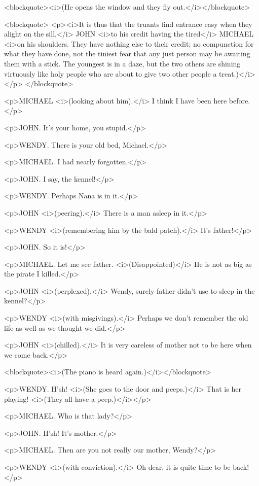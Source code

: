 <blockquote><i>(He opens the window and they fly out.</i></blockquote>

<blockquote> <p><i>It is thus that the truants find entrance easy when they alight on the sill,</i> JOHN <i>to his credit having the tired</i> MICHAEL <i>on his shoulders. They have nothing else to their credit; no compunction for what they have done, not the tiniest fear that any just person may be awaiting them with a stick. The youngest is in a daze, but the two others are shining virtuously like holy people who are about to give two other people a treat.)</i></p> </blockquote>

<p>MICHAEL <i>(looking about him).</i> I think I have been here before.</p>

<p>JOHN. It's your home, you stupid.</p>

<p>WENDY. There is your old bed, Michael.</p>

<p>MICHAEL. I had nearly forgotten.</p>

<p>JOHN. I say, the kennel!</p>

<p>WENDY. Perhaps Nana is in it.</p>

<p>JOHN <i>(peering).</i> There is a man asleep in it.</p>

<p>WENDY <i>(remembering him by the bald patch).</i> It's father!</p>

<p>JOHN. So it is!</p>

<p>MICHAEL. Let me see father. <i>(Disappointed)</i> He is not as big as the pirate I killed.</p>

<p>JOHN <i>(perplexed).</i> Wendy, surely father didn't use to sleep in the kennel?</p>

<p>WENDY <i>(with misgivings).</i> Perhaps we don't remember the old life as well as we thought we did.</p>

<p>JOHN <i>(chilled).</i> It is very careless of mother not to be here when we come back.</p>

<blockquote><i>(The piano is heard again.)</i></blockquote>

<p>WENDY. H'sh! <i>(She goes to the door and peeps.)</i> That is her playing! <i>(They all have a peep.)</i></p>

<p>MICHAEL. Who is that lady?</p>

<p>JOHN. H'sh! It's mother.</p>

<p>MICHAEL. Then are you not really our mother, Wendy?</p>

<p>WENDY <i>(with conviction).</i> Oh dear, it is quite time to be back!</p>

